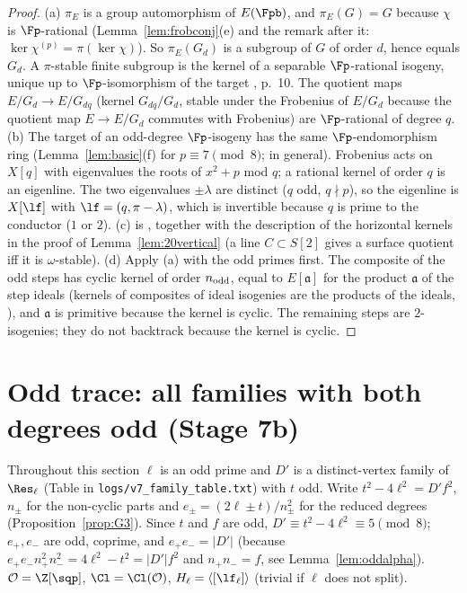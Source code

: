 \begin{proof}
(a) $\pi_E$ is a group automorphism of $E(\Fpb)$, and $\pi_E(G)=G$ because $\chi$ is $\Fp$-rational
(Lemma~\ref{lem:frobconj}(e) and the remark after it: $\ker\chi^{(p)}=\pi(\ker\chi)$).  So $\pi_E(G_d)$ is a subgroup of
$G$ of order $d$, hence equals $G_d$.  A $\pi$-stable finite subgroup is the kernel of a separable $\Fp$-rational isogeny,
unique up to $\Fp$-isomorphism of the target \cite[Lemma~6]{CSIDH}, p.~10.  The quotient maps
$E/G_{d}\to E/G_{dq}$ (kernel $G_{dq}/G_d$, stable under the Frobenius of $E/G_d$ because the quotient map
$E\to E/G_d$ commutes with Frobenius) are $\Fp$-rational of degree $q$.
(b) The target of an odd-degree $\Fp$-isogeny has the same $\Fp$-endomorphism ring (Lemma~\ref{lem:basic}(f) for
$p\equiv7\pmod8$; \cite[Thm.~2.7]{DG} in general).  Frobenius acts on $X[q]$ with eigenvalues the roots of $x^2+p$ mod $q$;
a rational kernel of order $q$ is an eigenline.  The two eigenvalues $\pm\lambda$ are distinct ($q$ odd, $q\nmid p$), so the
eigenline is $X[\lf]$ with $\lf=(q,\pi-\lambda)$, which is invertible because $q$ is prime to the conductor ($1$ or $2$).
(c) is \cite[Thm.~2.7]{DG}, together with the description of the horizontal kernels in the proof of
Lemma~\ref{lem:20vertical} (a line $C\subset S[2]$ gives a surface quotient iff it is $\omega$-stable).
(d) Apply (a) with the odd primes first.  The composite of the odd steps has cyclic kernel of order $n_{\rm odd}$, equal to
$E[\mathfrak a]$ for the product $\mathfrak a$ of the step ideals (kernels of composites of ideal isogenies are the products
of the ideals, \cite[\S2.2]{CPV}), and $\mathfrak a$ is primitive because the kernel is cyclic.  The remaining steps are
$2$-isogenies; they do not backtrack because the kernel is cyclic.
\end{proof}

\section{Odd trace: all families with both degrees odd (Stage 7b)}\label{sec:7b}

Throughout this section $\ell$ is an odd prime and $D'$ is a distinct-vertex family of $\Res_\ell$ (Table in
\texttt{logs/v7\_family\_table.txt}) with $t$ odd.  Write $t^2-4\ell^2=D'f^2$, $n_\pm$ for the non-cyclic parts and
$e_\pm=(2\ell\pm t)/n_\pm^2$ for the reduced degrees (Proposition~\ref{prop:G3}).  Since $t$ and $f$ are odd,
$D'\equiv t^2-4\ell^2\equiv5\pmod8$; $e_+,e_-$ are odd, coprime, and $e_+e_-=|D'|$ (because
$e_+e_-n_+^2n_-^2=4\ell^2-t^2=|D'|f^2$ and $n_+n_-=f$, see Lemma~\ref{lem:oddalpha}).  $\mathcal O=\Z[\sqp]$,
$\Cl=\Cl(\mathcal O)$, $H_\ell=\langle[\lf_\ell]\rangle$ (trivial if $\ell$ does not split).

